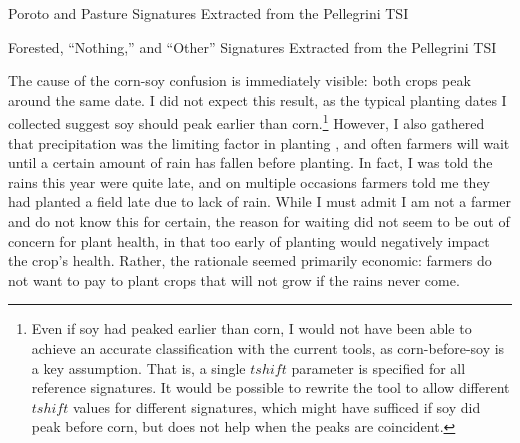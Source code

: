 \begin{ssfigure}
  \centering
  
  \caption{Poroto and Pasture Signatures Extracted from the Pellegrini TSI}
  \label{fig:ARporotopasturesigs}
\end{ssfigure}

\begin{ssfigure}
  \centering
  
  \caption{Forested, ``Nothing,'' and ``Other'' Signatures Extracted from the Pellegrini TSI}
  \label{fig:ARothersigs}
\end{ssfigure}

The cause of the corn-soy confusion is immediately visible: both crops peak around the same date. I did not expect this result, as the typical planting dates I collected suggest soy should peak earlier than corn.\footnote{Even if soy had peaked earlier than corn, I would not have been able to achieve an accurate classification with the current tools, as corn-before-soy is a key assumption. That is, a single $tshift$ parameter is specified for all reference signatures. It would be possible to rewrite the tool to allow different $tshift$ values for different signatures, which might have sufficed if soy did peak before corn, but does not help when the peaks are coincident.} However, I also gathered that precipitation was the limiting factor in planting \autocite[confirmed by][]{sacks2010crop}, and often farmers will wait until a certain amount of rain has fallen before planting. In fact, I was told the rains this year were quite late, and on multiple occasions farmers told me they had planted a field late due to lack of rain. While I must admit I am not a farmer and do not know this for certain, the reason for waiting did not seem to be out of concern for plant health, in that too early of planting would negatively impact the crop's health. Rather, the rationale seemed primarily economic: farmers do not want to pay to plant crops that will not grow if the rains never come.

